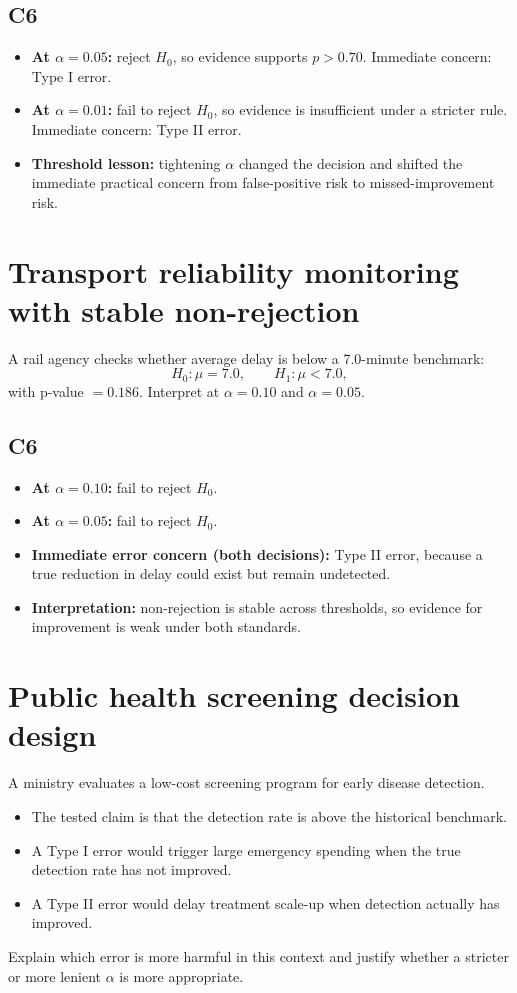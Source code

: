 \begin{ExamProblems}
\subsection*{C6}
\begin{itemize}
    \item \textbf{At \(\alpha=0.05\):} reject \(H_0\), so evidence supports \(p>0.70\). Immediate concern: Type I error.
    \item \textbf{At \(\alpha=0.01\):} fail to reject \(H_0\), so evidence is insufficient under a stricter rule. Immediate concern: Type II error.
    \item \textbf{Threshold lesson:} tightening \(\alpha\) changed the decision and shifted the immediate practical concern from false-positive risk to missed-improvement risk.
\end{itemize}

\item
\section{Transport reliability monitoring with stable non-rejection}
A rail agency checks whether average delay is below a 7.0-minute benchmark:
\[
H_0\colon \mu=7.0,\qquad H_1\colon \mu<7.0,
\]
with p-value \(=0.186\). Interpret at \(\alpha=0.10\) and \(\alpha=0.05\).

\subsection*{C6}
\begin{itemize}
    \item \textbf{At \(\alpha=0.10\):} fail to reject \(H_0\).
    \item \textbf{At \(\alpha=0.05\):} fail to reject \(H_0\).
    \item \textbf{Immediate error concern (both decisions):} Type II error, because a true reduction in delay could exist but remain undetected.
    \item \textbf{Interpretation:} non-rejection is stable across thresholds, so evidence for improvement is weak under both standards.
\end{itemize}

\item
\section{Public health screening decision design}
A ministry evaluates a low-cost screening program for early disease detection.
\begin{itemize}
    \item The tested claim is that the detection rate is above the historical benchmark.
    \item A Type I error would trigger large emergency spending when the true detection rate has not improved.
    \item A Type II error would delay treatment scale-up when detection actually has improved.
\end{itemize}
Explain which error is more harmful in this context and justify whether a stricter or more lenient \(\alpha\) is more appropriate.


\end{ExamProblems}
